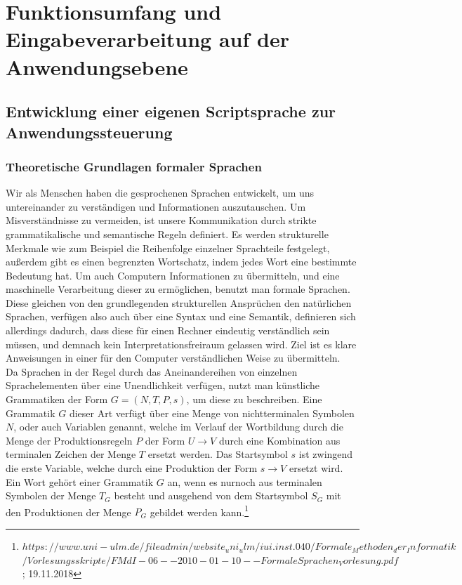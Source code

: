 \documentclass[12pt, a4paper]{scrartcl}
\begin{document}
\section{Funktionsumfang und Eingabeverarbeitung auf der Anwendungsebene}

\subsection{Entwicklung einer eigenen Scriptsprache zur Anwendungssteuerung}
\subsubsection{Theoretische Grundlagen formaler Sprachen}
Wir als Menschen haben die gesprochenen Sprachen entwickelt, um uns untereinander zu verständigen und Informationen auszutauschen. Um Misverständnisse zu vermeiden, ist unsere Kommunikation durch strikte grammatikalische und semantische Regeln definiert. Es werden strukturelle Merkmale wie zum Beispiel die Reihenfolge einzelner Sprachteile festgelegt, außerdem gibt es einen begrenzten Wortschatz, indem jedes Wort eine bestimmte Bedeutung hat.
Um auch Computern Informationen zu übermitteln, und eine maschinelle Verarbeitung dieser zu ermöglichen, benutzt man formale Sprachen. Diese gleichen von den grundlegenden strukturellen Ansprüchen den natürlichen Sprachen, verfügen also auch über eine Syntax und eine Semantik, definieren sich allerdings dadurch, dass diese für einen Rechner eindeutig verständlich sein müssen, und demnach kein Interpretationsfreiraum gelassen wird. Ziel ist es klare Anweisungen in einer für den Computer verständlichen Weise zu übermitteln.\\
Da Sprachen in der Regel durch das Aneinandereihen von einzelnen Sprachelementen über eine Unendlichkeit verfügen, nutzt man künstliche Grammatiken der Form $G = (N, T, P, s)$, um diese zu beschreiben. Eine Grammatik $G$ dieser Art verfügt über eine Menge von nichtterminalen Symbolen $N$, oder auch Variablen genannt, welche im Verlauf der Wortbildung durch die Menge der Produktionsregeln $P$ der Form $U \rightarrow V$ durch eine Kombination aus terminalen Zeichen der Menge $T$ ersetzt werden. Das Startsymbol $s$ ist zwingend die erste Variable, welche durch eine Produktion der Form $s \rightarrow V$ ersetzt wird. Ein Wort gehört einer Grammatik $G$ an, wenn es nurnoch aus terminalen Symbolen der Menge $T_G$ besteht und ausgehend von dem Startsymbol $S_G$ mit den Produktionen der Menge $P_G$ gebildet werden kann.\footnote{$	https://www.uni-ulm.de/fileadmin/website_uni_ulm/iui.inst.040/Formale_Methoden_der_Informatik$\\$/Vorlesungsskripte/FMdI-06--2010-01-10--FormaleSprachen_Vorlesung.pdf$
; 19.11.2018}\\
\end{document}
